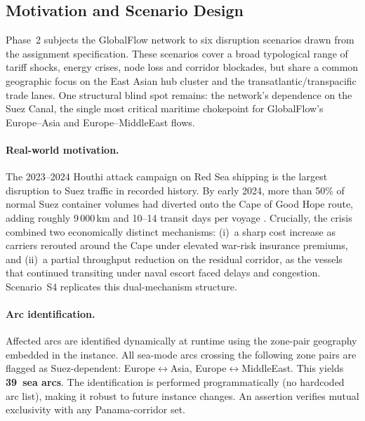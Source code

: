 
\subsection{Motivation and Scenario Design}
\label{sec:s4_motivation}

Phase~2 subjects the GlobalFlow network to six disruption scenarios
drawn from the assignment specification. These scenarios cover a
broad typological range of tariff shocks, energy crises, node loss and
corridor blockades, but share a common geographic focus on the East
Asian hub cluster and the transatlantic/transpacific trade lanes.
One structural blind spot remains: the network's dependence on the
Suez Canal, the single most critical maritime chokepoint for
GlobalFlow's Europe--Asia and Europe--MiddleEast flows.

\paragraph{Real-world motivation.}
The 2023--2024 Houthi attack campaign on Red Sea shipping is the
largest disruption to Suez traffic in recorded history. By early 2024,
more than 50\% of normal Suez container volumes had diverted onto the
Cape of Good Hope route, adding roughly 9\,000\,km and 10--14 transit
days per voyage \cite{drewry2024}. Crucially, the crisis combined
two economically distinct mechanisms: (i)~a sharp cost increase
as carriers rerouted around the Cape under elevated war-risk insurance
premiums, and (ii)~a partial throughput reduction on the residual
corridor, as the vessels that continued transiting under naval escort
faced delays and congestion. Scenario~S4 replicates this
dual-mechanism structure.

\paragraph{Arc identification.}
Affected arcs are identified dynamically at runtime using the
zone-pair geography embedded in the instance. All sea-mode arcs
crossing the following zone pairs are flagged as Suez-dependent:
Europe$\leftrightarrow$Asia, Europe$\leftrightarrow$MiddleEast.
This yields \textbf{39~sea arcs}. The identification is performed
programmatically (no hardcoded arc list), making it robust to future
instance changes. An assertion verifies mutual exclusivity with any
Panama-corridor set.

